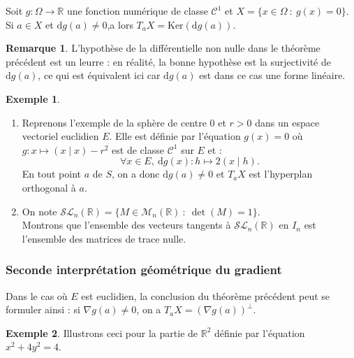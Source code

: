 \documentclass[french]{article}
\newcommand{\R}{\mathbb{R}}
\renewcommand{\ker}{\text{Ker}}
\newcommand{\Tr}{\text{Tr}}
\renewcommand{\d}{\text{d}}
\theoremstyle{plain}
\theoremstyle{definition}
\newtheorem*{ex}{Exemple}
\newtheorem*{rmq}{Remarque}
\theoremstyle{remark}
\begin{document}
\begin{thm}%
	Soit $g:\Omega\to\R$ une fonction numérique de classe $\mathcal{C}^1$ et $X=\{x\in\Omega\ :\ g(x)=0\}$. \\
	Si $a\in X$ et $\d g(a)\ne0$,a lors $T_aX=\ker(\d g(a))$.
\end{thm}

\begin{rmq}
	L'hypothèse de la différentielle non nulle dans le théorème précédent est un leurre : en réalité, la bonne hypothèse est la surjectivité de $\d g(a)$, ce qui est équivalent ici car $\d g(a)$ est dans ce cas une forme linéaire.
\end{rmq}

\begin{ex}
	\begin{enumerate}
		\item Reprenons l'exemple de la sphère de centre $0$ et $r>0$ dans un espace vectoriel euclidien $E$. Elle est définie par l'équation $g(x)=0$ où $g:x\mapsto (x\mid x)-r^2$ est de classe $\mathcal{C}^1$ sur $E$ et :
		$$\forall x\in E,\ \d g(x):h\mapsto 2(x\mid h).$$
		En tout point $a$ de $S$, on a donc $\d g(a)\ne0$ et $T_aX$ est l'hyperplan orthogonal à $a$.
		\item On note $\mathcal{SL}_n(\R)=\{M\in\mathcal{M}_n(\R)\ :\ \det(M)=1\}$.\\
		Montrons que l'ensemble des vecteurs tangents à $\mathcal{SL}_n(\R)$ en $I_n$ est l'ensemble des matrices de trace nulle. %
	\end{enumerate}
\end{ex}

\subsubsection*{Seconde interprétation géométrique du gradient}

Dans le cas où $E$ est euclidien, la conclusion du théorème précédent peut se formuler ainsi : si $\nabla g(a)\ne0$, on a $T_aX=(\nabla g(a))^\bot$.

\begin{ex}
	Illustrons ceci pour la partie de $\R^2$ définie par l'équation $x^2+4y^2=4$.
\end{ex}
\end{document}
